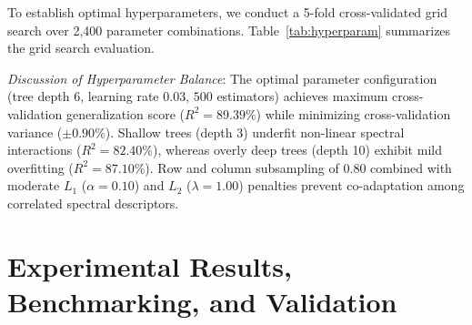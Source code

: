 \documentclass[journal]{IEEEtran}
\begin{document}
To establish optimal hyperparameters, we conduct a 5-fold cross-validated grid search over 2,400 parameter combinations. Table~\ref{tab:hyperparam} summarizes the grid search evaluation.

\begin{table}[htbp]
\caption{Hyperparameter Grid Search Optimization on Normalized Emissions ($y$)}
\label{tab:hyperparam}
\centering
{}
\end{table}

\textit{Discussion of Hyperparameter Balance}:
The optimal parameter configuration (tree depth $6$, learning rate $0.03$, $500$ estimators) achieves maximum cross-validation generalization score ($R^2 = 89.39\%$) while minimizing cross-validation variance ($\pm 0.90\%$). Shallow trees (depth 3) underfit non-linear spectral interactions ($R^2 = 82.40\%$), whereas overly deep trees (depth 10) exhibit mild overfitting ($R^2 = 87.10\%$). Row and column subsampling of $0.80$ combined with moderate $L_1$ ($\alpha = 0.10$) and $L_2$ ($\lambda = 1.00$) penalties prevent co-adaptation among correlated spectral descriptors.

\section{Experimental Results, Benchmarking, and Validation}
\end{document}
